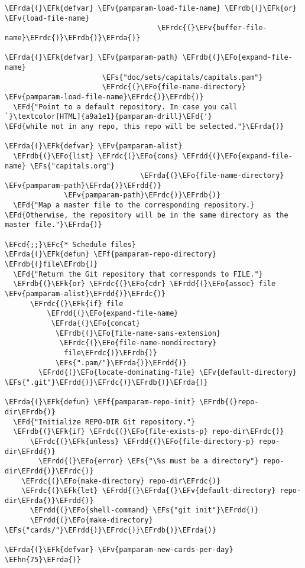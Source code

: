 \documentclass[a4wide,10pt]{article}
\newcommand{\EFc}[1]{\textcolor{EFc}{#1}} %
\newcommand{\EFcd}[1]{\textcolor{EFcd}{#1}} %
\newcommand{\EFs}[1]{\textcolor{EFs}{#1}} %
\newcommand{\EFd}[1]{\textcolor{EFd}{#1}} %
\newcommand{\EFk}[1]{\textcolor{EFk}{#1}} %
\newcommand{\EFf}[1]{\textcolor{EFf}{#1}} %
\newcommand{\EFv}[1]{\textcolor{EFv}{#1}} %
\newcommand{\EFo}[1]{\textcolor{EFo}{#1}} %
\newcommand{\EFhn}[1]{\textcolor{EFhn}{\textbf{#1}}} %
\newcommand{\EFrda}[1]{\textcolor{EFrda}{#1}} %
\newcommand{\EFrdb}[1]{\textcolor{EFrdb}{#1}} %
\newcommand{\EFrdc}[1]{\textcolor{EFrdc}{#1}} %
\newcommand{\EFrdd}[1]{\textcolor{EFrdd}{#1}} %
\begin{document}
\begin{Code}
\begin{Verbatim}
\EFrda{(}\EFk{defvar} \EFv{pamparam-load-file-name} \EFrdb{(}\EFk{or} \EFv{load-file-name}
                                    \EFrdc{(}\EFv{buffer-file-name}\EFrdc{)}\EFrdb{)}\EFrda{)}

\EFrda{(}\EFk{defvar} \EFv{pamparam-path} \EFrdb{(}\EFo{expand-file-name}
                       \EFs{"doc/sets/capitals/capitals.pam"}
                       \EFrdc{(}\EFo{file-name-directory} \EFv{pamparam-load-file-name}\EFrdc{)}\EFrdb{)}
  \EFd{"Point to a default repository. In case you call `}\textcolor[HTML]{a9a1e1}{pamparam-drill}\EFd{'}
\EFd{while not in any repo, this repo will be selected."}\EFrda{)}

\EFrda{(}\EFk{defvar} \EFv{pamparam-alist}
  \EFrdb{(}\EFo{list} \EFrdc{(}\EFo{cons} \EFrdd{(}\EFo{expand-file-name} \EFs{"capitals.org"}
                                \EFrda{(}\EFo{file-name-directory} \EFv{pamparam-path}\EFrda{)}\EFrdd{)}
              \EFv{pamparam-path}\EFrdc{)}\EFrdb{)}
  \EFd{"Map a master file to the corresponding repository.}
\EFd{Otherwise, the repository will be in the same directory as the master file."}\EFrda{)}

\EFcd{;;}\EFc{* Schedule files}
\EFrda{(}\EFk{defun} \EFf{pamparam-repo-directory} \EFrdb{(}file\EFrdb{)}
  \EFd{"Return the Git repository that corresponds to FILE."}
  \EFrdb{(}\EFk{or} \EFrdc{(}\EFo{cdr} \EFrdd{(}\EFo{assoc} file \EFv{pamparam-alist}\EFrdd{)}\EFrdc{)}
      \EFrdc{(}\EFk{if} file
          \EFrdd{(}\EFo{expand-file-name}
           \EFrda{(}\EFo{concat}
            \EFrdb{(}\EFo{file-name-sans-extension}
             \EFrdc{(}\EFo{file-name-nondirectory}
              file\EFrdc{)}\EFrdb{)}
            \EFs{".pam/"}\EFrda{)}\EFrdd{)}
        \EFrdd{(}\EFo{locate-dominating-file} \EFv{default-directory} \EFs{".git"}\EFrdd{)}\EFrdc{)}\EFrdb{)}\EFrda{)}

\EFrda{(}\EFk{defun} \EFf{pamparam-repo-init} \EFrdb{(}repo-dir\EFrdb{)}
  \EFd{"Initialize REPO-DIR Git repository."}
  \EFrdb{(}\EFk{if} \EFrdc{(}\EFo{file-exists-p} repo-dir\EFrdc{)}
      \EFrdc{(}\EFk{unless} \EFrdd{(}\EFo{file-directory-p} repo-dir\EFrdd{)}
        \EFrdd{(}\EFo{error} \EFs{"\%s must be a directory"} repo-dir\EFrdd{)}\EFrdc{)}
    \EFrdc{(}\EFo{make-directory} repo-dir\EFrdc{)}
    \EFrdc{(}\EFk{let} \EFrdd{(}\EFrda{(}\EFv{default-directory} repo-dir\EFrda{)}\EFrdd{)}
      \EFrdd{(}\EFo{shell-command} \EFs{"git init"}\EFrdd{)}
      \EFrdd{(}\EFo{make-directory} \EFs{"cards/"}\EFrdd{)}\EFrdc{)}\EFrdb{)}\EFrda{)}

\EFrda{(}\EFk{defvar} \EFv{pamparam-new-cards-per-day} \EFhn{75}\EFrda{)}


\end{Verbatim}
\end{Code}
\end{document}
